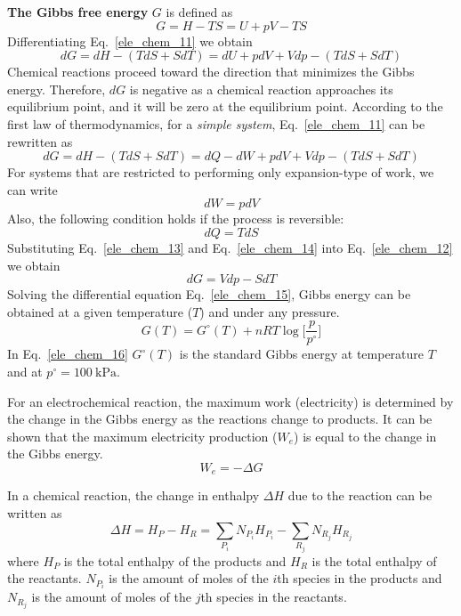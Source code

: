 \documentclass[11pt,a4paper]{article}
\numberwithin{equation}{section}
\theoremstyle{it}
\theoremstyle{definition}
\begin{document}
\textbf{The Gibbs free energy} $G$ is defined as
\begin{equation}\label{ele_chem_10}
	G = H-TS = U + pV - TS
\end{equation}
Differentiating Eq.~\eqref{ele_chem_11} we obtain
\begin{equation}\label{ele_chem_11}
	dG=dH-(TdS+SdT)=dU+pdV+Vdp-(TdS+SdT)
\end{equation}
Chemical reactions proceed toward the direction that minimizes the Gibbs energy. Therefore, $dG$ is negative as a chemical reaction approaches its equilibrium point, and it will be zero at the equilibrium point. According to the first law of thermodynamics, for a \textit{simple system}, Eq.~\eqref{ele_chem_11} can be rewritten as
\begin{equation}\label{ele_chem_12}
	dG=dH-(TdS+SdT)=dQ-dW+pdV+Vdp-(TdS+SdT)
\end{equation}
For systems that are restricted to performing only expansion-type of work, we can write
\begin{equation}\label{ele_chem_13}
	dW=pdV
\end{equation}
Also, the following condition holds if the process is reversible:
\begin{equation}\label{ele_chem_14}
	dQ=TdS
\end{equation}
Substituting Eq.~\eqref{ele_chem_13} and  Eq.~\eqref{ele_chem_14} into  Eq.~\eqref{ele_chem_12} we obtain
\begin{equation}\label{ele_chem_15}
	dG=Vdp-SdT
\end{equation}
Solving the differential equation Eq.~\eqref{ele_chem_15}, Gibbs energy can be obtained at a given temperature ($T$) and under any pressure.
\begin{equation}\label{ele_chem_16}
	G(T)=G^\circ(T)+nRT\log\Big[\frac{p}{p^\circ}\Big]
\end{equation}
In Eq.~\eqref{ele_chem_16} $G^\circ(T)$ is the standard Gibbs energy at temperature $T$ and at $p^\circ=\SI{100}{\kilo\pascal}$.

For an electrochemical reaction, the maximum work (electricity) is determined by the change in the Gibbs energy as the reactions change to products. It can be shown that the maximum electricity production ($W_e$) is equal to the change in the Gibbs energy.
\begin{equation}\label{ele_chem_17}
	W_e=-\Delta G
\end{equation}

In a chemical reaction, the change in enthalpy $\Delta H$ due to the reaction can be written as
\begin{equation}\label{ele_chem_18}
	\Delta H = H_P-H_R=\sum_{P_i}N_{P_i}H_{P_i}-\sum_{R_j}N_{R_j}H_{R_j}
\end{equation}
where $H_{P}$ is the total enthalpy of the products and $H_R$ is the total enthalpy of the reactants. $N_{P_i}$ is the amount of moles of the $i$th species in the products and $N_{R_j}$ is the amount of moles of the $j$th species in the reactants.
\end{document}
